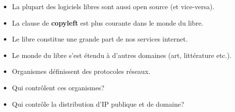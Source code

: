 \begin{slide}
	\begin{itemize}
		\item La plupart des logiciels libres sont aussi open source (et vice-versa).
		\item La clause de \textbf{copyleft} est plus courante dans le monde du libre.
		\item Le libre constitue une grande part de nos services internet.
		\item Le monde du libre s'est étendu à d'autres domaines (art, littérature etc.).
	\end{itemize}
\end{slide}

\begin{slide}
	\begin{itemize}
		\item Organismes définissent des protocoles réseaux.
		\item Qui contrôlent ces organismes?
		\item Qui contrôle la distribution d'IP publique et de domaine?
	\end{itemize}
\end{slide}
